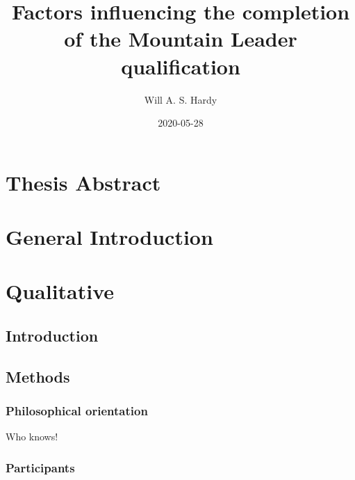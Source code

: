 \documentclass[a4paper,]{book}
\title{Factors influencing the completion of the Mountain Leader qualification}
\author{Will A. S. Hardy}
\date{2020-05-28}
\begin{document}
\maketitle

{
\setcounter{tocdepth}{2}
\tableofcontents
}
\listoftables

\listoffigures

\hypertarget{thesis-abstract}{%
\chapter*{Thesis Abstract}\label{thesis-abstract}}

\hypertarget{general-introduction}{%
\chapter{General Introduction}\label{general-introduction}}

\hypertarget{qualitative}{%
\chapter{Qualitative}\label{qualitative}}

\hypertarget{introduction}{%
\section{Introduction}\label{introduction}}

\hypertarget{methods}{%
\section{Methods}\label{methods}}

\hypertarget{philosophical-orientation}{%
\subsection{Philosophical orientation}\label{philosophical-orientation}}

Who knows!

\hypertarget{participants}{%
\subsection{Participants}\label{participants}}
\end{document}
